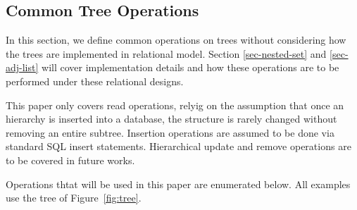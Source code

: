 \subsection{Common Tree Operations}

In this section, we define common operations on trees without considering how the trees are implemented in relational model. Section \ref{sec-nested-set} and \ref{sec-adj-list} will cover implementation details and how these operations are to be performed under these relational designs.

This paper only covers read operations, relyig on the assumption that once an hierarchy is inserted into a database, the structure is rarely changed without removing an entire subtree. Insertion operations are assumed to be done via standard SQL insert statements. Hierarchical update and remove operations are to be covered in future works.

Operations thtat will be used in this paper are enumerated below. All examples use the tree of Figure~\ref{fig:tree}.



